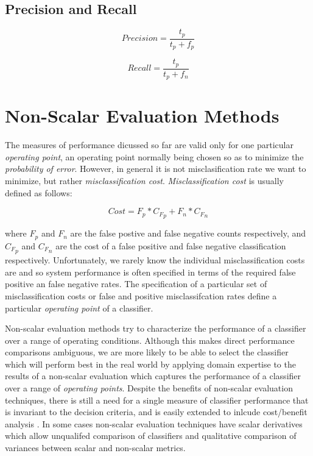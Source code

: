\documentclass[10pt]{unbthesis}
\begin{document}
\subsection*{Precision and Recall}

\begin{equation}
\label{equ:precision}
Precision = \frac{t_p}{t_p + f_p}
\end{equation}


\begin{equation}
\label{equ:recall}
Recall = \frac{t_p}{t_p + f_n}
\end{equation}

\section*{Non-Scalar Evaluation Methods}
The measures of performance dicussed so far are valid only for one
particular \textit{operating point}, an operating point normally being
chosen so as to minimize the \textit{probability of error}. However,
in general it is not misclasification rate we want to minimize, but
rather \textit{misclassification cost}. \textit{Misclassification
  cost} is usually defined as follows:

\begin{equation}
\label{equ:misclasscost}
Cost = F_p * {C_F}_p + F_n * {C_F}_n
\end{equation}

where \(F_p\) and \(F_n\) are the false postive and false negative
counts respectively, and \({C_F}_p\) and \({C_F}_n\) are the cost of a
false positive and false negative classification respectively.
Unfortunately, we rarely know the individual misclassification costs
are and so system performance is often specified in terms of the
required false positive an false negative rates. The specification of
a particular set of misclassification costs or false and positive
misclassifcation rates define a particular \textit{operating point} of
a classifier.

Non-scalar evaluation methods try to characterize the performance of a
classifier over a range of operating conditions. Although this makes
direct performance comparisons ambiguous, we are more likely to be
able to select the classifier which will perform best in the real
world by applying domain expertise to the results of a non-scalar
evaluation which captures the performance of a classifier over a range
of \textit{operating points}. Despite the benefits of non-scalar
evaluation techniques, there is still a need for a single measure of
classifier performance that is invariant to the decision criteria, and
is easily extended to inlcude cost/benefit analysis
\cite{Refworks:32}. In some cases non-scalar evaluation techniques
have scalar derivatives which allow unqualifed comparison of
classifiers and qualitative comparison of variances between scalar and
non-scalar metrics.
\end{document}
